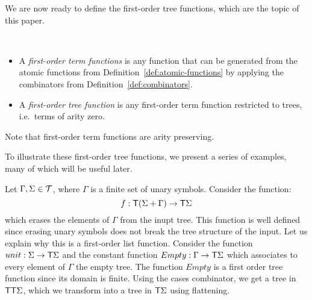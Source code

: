 We are now ready to define the first-order tree functions, which are the topic of this paper. 

\begin{definition} \label{def:fo-tree-functions} \ 
    \begin{itemize}
        \item A \emph{first-order term functions} is any function that can be  generated from the atomic functions from Definition~\ref{def:atomic-functions} by applying the  combinators from Definition~\ref{def:combinators}.
        \item  A \emph{first-order tree function} is any first-order term function restricted to trees, i.e.~terms of arity zero.
    \end{itemize}    
\end{definition}
Note that first-order term functions are arity preserving. 

To illustrate these first-order tree functions, we present a series of examples, many of which will be useful later.

\bigskip
%
%
\noindent\begin{example}[Filter] Let $\Gamma, \Sigma\in{\mathcal T}$, where $\Gamma$ is a finite set of unary symbols. Consider the function:
$$ f:\mathsf T (\Sigma+\Gamma)\to\mathsf T \Sigma$$
which erases the elements of $\Gamma$ from the inupt tree. This function is well defined since erasing unary symbols does not break the tree structure of the input. 
Let us explain why this is a first-order list function. 
Consider the function $unit:\Sigma\to\mathsf T\Sigma$ and the constant function $Empty:\Gamma\to\mathsf T\Sigma$ which associates to every element of $\Gamma$ the empty tree. The function $Empty$ is a first order tree function since its domain is finite. Using the cases combinator, we get a tree in $\mathsf T\mathsf T\Sigma$, which we transform into a tree in $\mathsf T \Sigma$ using flattening.
\end{example}

